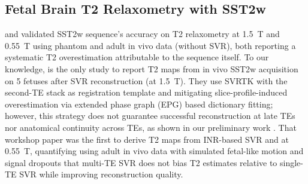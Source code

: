 \documentclass[preprint,authoryear,12pt]{elsarticle}
\begin{document}
\subsection{Fetal Brain T2 Relaxometry with SST2w}
 \citet{lajous_t2_2020} and \citet{roulet_t2_2025} validated SST2w sequence's accuracy on T2 relaxometry at 1.5~T and 0.55~T using phantom and adult in vivo data (without SVR), both reporting a systematic T2 overestimation attributable to the sequence itself. To our knowledge, \citet{bhattacharya_vivo_2024} is the only study to report T2 maps from in vivo SST2w acquisition on 5 fetuses after SVR reconstruction (at 1.5~T). They use SVRTK with the second-TE stack as registration template and mitigating slice-profile-induced overestimation via extended phase graph (EPG) \citep{weigel_extended_2015} based dictionary fitting; however, this strategy does not guarantee successful reconstruction at late TEs nor anatomical continuity across TEs, as shown in our preliminary work \citep{bulut_physics-informed_2025}. That workshop paper was the first to derive T2 maps from INR-based SVR and at 0.55~T, quantifying using adult in vivo data with simulated fetal-like motion and signal dropouts that multi-TE SVR does not bias T2 estimates relative to single-TE SVR while improving reconstruction quality. 


\newpage
\end{document}
